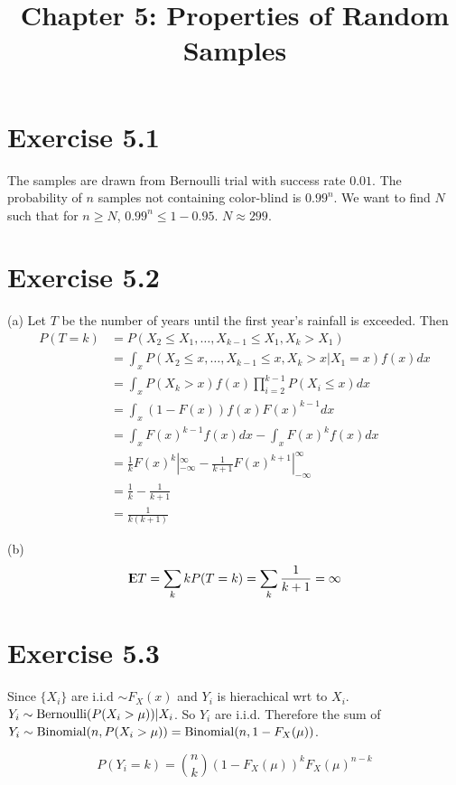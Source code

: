 \documentclass[12pt]{article}
\title{Chapter 5: Properties of Random Samples}
\begin{document}
\maketitle

\section*{Exercise 5.1}
The samples are drawn from Bernoulli trial with success rate $0.01$. The probability of $n$ samples not containing color-blind is $0.99^n$.  We want to find $N$ such that for $n \geq N$,  $0.99^n \leq 1- 0.95$. $N \approx 299$. \QED

\section*{Exercise 5.2}
(a) Let $T$ be the number of years until the first year's rainfall is exceeded. Then 
$$\begin{aligned}
P(T=k) &= P(X_2 \leq X_1, \ldots , X_{k-1} \leq X_1, X_k > X_1) \\
&= \int_{x}  P(X_2 \leq x, \ldots , X_{k-1} \leq x, X_k > x | X_1 = x)f(x) dx \\
&= \int_{x} P(X_k > x) f(x) \prod_{i=2}^{k-1} P(X_i \leq x) dx  \\
&= \int_{x} (1- F(x)) f(x) F(x)^{k-1} dx  \\
&= \int_{x}  F(x)^{k-1}f(x) dx - \int_{x}  F(x)^k f(x) dx  \\
&= \frac{1}{k} F(x)^k|^{\infty}_{-\infty} - \frac{1}{k+1} F(x)^{k+1}|^{\infty}_{-\infty} \\
&= \frac{1}{k} - \frac{1}{k+1} \\
&= \frac{1}{k(k+1)}
\end{aligned} 
$$
\QED

(b) $${\rm I\kern-.3em E} T = \sum_k k P(T=k) = \sum_k \frac{1}{k+1} = \infty $$  \QED

\section*{Exercise 5.3}
Since $\{X_i\}$ are i.i.d $\sim F_X(x)$ and $Y_i$ is hierachical wrt to $X_i$. $Y_i \sim \mathrm{Bernoulli}(P(X_i > \mu)) | X_i$. So $Y_i$ are i.i.d. Therefore the sum of $Y_i \sim \mathrm{Binomial} (n, P(X_i > \mu)) = \mathrm{Binomial} (n, 1 - F_X(\mu)) $.

$$ P(Y_i = k) = {n \choose k} (1 - F_X(\mu))^k F_X(\mu)^{n-k}$$      
\QED
\end{document}
